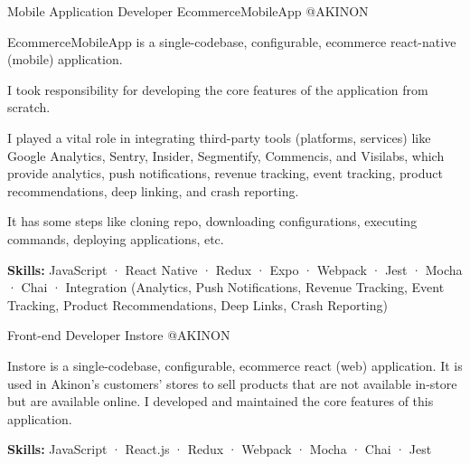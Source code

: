 \begin{cventries}
  \cventry
    {Mobile Application Developer} %
    {EcommerceMobileApp} %
    {@AKINON} %
    {}
    {
      \begin{cvitems} %
        \item {EcommerceMobileApp is a single-codebase, configurable, ecommerce react-native (mobile) application.}
        \item {I took responsibility for developing the core features of the application from scratch.}
        \item {I played a vital role in integrating third-party tools (platforms, services) like Google Analytics, Sentry, Insider, Segmentify, Commencis, and Visilabs, which provide analytics, push notifications, revenue tracking, event tracking, product recommendations, deep linking, and crash reporting.}
        \item {It has some steps like cloning repo, downloading configurations, executing commands, deploying applications, etc.}
        \item {\textbf {Skills:} JavaScript · React Native · Redux · Expo · Webpack · Jest · Mocha · Chai · Integration (Analytics, Push Notifications, Revenue Tracking, Event Tracking, Product Recommendations, Deep Links, Crash Reporting)}
      \end{cvitems}
    }

  \cventry
    {Front-end Developer} %
    {Instore} %
    {@AKINON} %
    {}
    {
      \begin{cvitems} %
        \item {Instore is a single-codebase, configurable, ecommerce react (web) application. It is used in Akinon's customers' stores to sell products that are not available in-store but are available online. I developed and maintained the core features of this application.}
        \item {\textbf {Skills:} JavaScript · React.js · Redux · Webpack · Mocha · Chai · Jest}
      \end{cvitems}
    }


\end{cventries}
